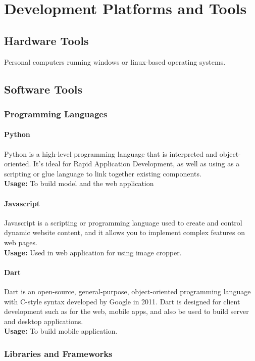 \chapter{Development Platforms and Tools}
\section{Hardware Tools }
Personal computers running windows or linux-based operating systems.

\section{Software Tools}
\subsection{Programming Languages}
\subsubsection{Python}
Python is a high-level programming language that is interpreted and object-oriented. It's ideal for Rapid Application Development, as well as using as a scripting or glue language to link together existing components.
\\
\textbf{Usage:} To build model and the web application

\subsubsection{Javascript}
Javascript is a scripting or programming language used to create and control dynamic website content, and it allows you to implement complex features on web pages.
\\
\textbf{Usage:} Used in web application for using image cropper.

\subsubsection{Dart}
Dart is an open-source, general-purpose, object-oriented programming language with C-style syntax developed by Google in 2011. Dart is designed for client development such as for the web, mobile apps, and also be used to build server and desktop applications.
\\
\textbf{Usage:} To build mobile application.

\subsection{Libraries and Frameworks}
